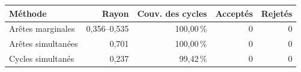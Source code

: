 \begin{tabular}{@{}lrrrr@{}}
\toprule
Méthode & Rayon & Couv. des cycles & Acceptés & Rejetés\\
\midrule
Arêtes marginales & 0,356--0,535 & 100,00\,\% & 0 & 0\\
Arêtes simultanées & 0,701 & 100,00\,\% & 0 & 0\\
Cycles simultanés & 0,237 & 99,42\,\% & 0 & 0\\
\bottomrule
\end{tabular}

